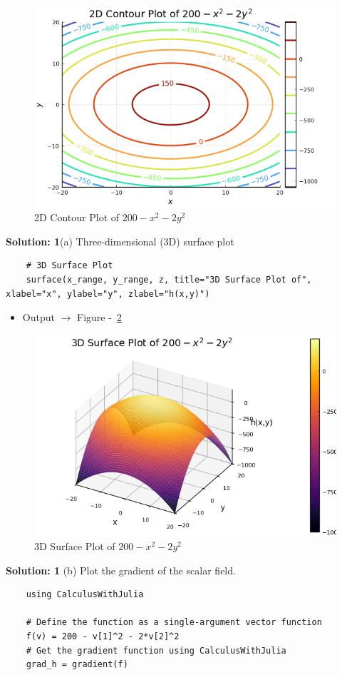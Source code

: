 \documentclass{homework}
\begin{document}
\begin{solution}
    \begin{figure}[H]
        \centering
        \includegraphics[width=0.5\linewidth]{2Dcontour_plot.png}
        \caption{2D Contour Plot of $200 - x^2 - 2y^2$}
        \label{fig:contour}
    \end{figure}

    
    \textbf{Solution: 1}(a) Three-dimensional (3D) surface plot
    \begin{verbatim}
    # 3D Surface Plot
    surface(x_range, y_range, z, title="3D Surface Plot of", xlabel="x", ylabel="y", zlabel="h(x,y)")
    \end{verbatim}
    
    \begin{itemize}
      \item Output $\rightarrow$ Figure -~\ref{fig:3Dcoutour}
    \end{itemize}
    
    \begin{figure}[H]
      \centering
      \includegraphics[width=0.5\linewidth]{media/3Dsurface_plot.png}
      \caption{3D Surface Plot of $200 - x^2 - 2y^2$}
      \label{fig:3Dcoutour}
    \end{figure}
    
    \textbf{Solution: 1}
    (b)  Plot the gradient of the scalar field.
    \begin{verbatim}
    using CalculusWithJulia

    # Define the function as a single-argument vector function
    f(v) = 200 - v[1]^2 - 2*v[2]^2
    # Get the gradient function using CalculusWithJulia
    grad_h = gradient(f)


\end{verbatim}
\end{solution}
\end{document}
